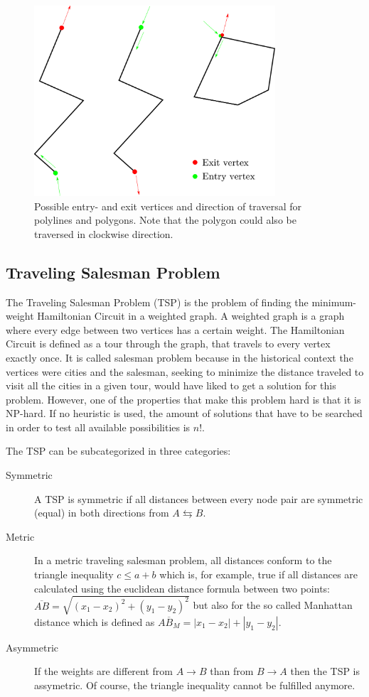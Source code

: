 \documentclass[10pt,twoside,a4paper]{report}
\begin{document}
\begin{figure}
\includegraphics[width=0.8\textwidth]{images/path_planning/traversal.pdf}
\caption{Possible entry- and exit vertices and direction of traversal for polylines and polygons. Note that the polygon could also be traversed in clockwise direction.}
\end{figure}

\subsection{Traveling Salesman Problem}

The Traveling Salesman Problem (TSP) is the problem of finding the minimum-weight Hamiltonian Circuit in a weighted graph. A weighted graph is a graph where every edge between two vertices has a certain weight. The Hamiltonian Circuit is defined as a tour through the graph, that travels to every vertex exactly once. It is called salesman problem because in the historical context the vertices were cities and the salesman, seeking to minimize the distance traveled to visit all the cities in a given tour, would have liked to get a solution for this problem. However, one of the properties that make this problem hard is that it is NP-hard. If no heuristic is used, the amount of solutions that have to be searched in order to test all available possibilities is $n!$.

The TSP can be subcategorized in three categories: 

\begin{description}
\item[Symmetric] A TSP is symmetric if all distances between every node pair are symmetric (equal) in both directions from $A \leftrightarrows B$.
\item[Metric] In a metric traveling salesman problem, all distances conform to the triangle inequality $c \leq a + b$ which is, for example, true if all distances are calculated using the euclidean distance formula between two points: $\overline{AB} = \sqrt{(x_1 -x_2)^2 + (y_1 - y_2)^2}$ but also for the so called Manhattan distance which is defined as $\overline{AB_M} = |x_1-x_2| + |y_1 - y_2|$.
\item[Asymmetric] If the weights are different from $A \rightarrow B$ than from $B \rightarrow A$ then the TSP is assymetric. Of course, the triangle inequality cannot be fulfilled anymore.
\end{description}
\end{document}
